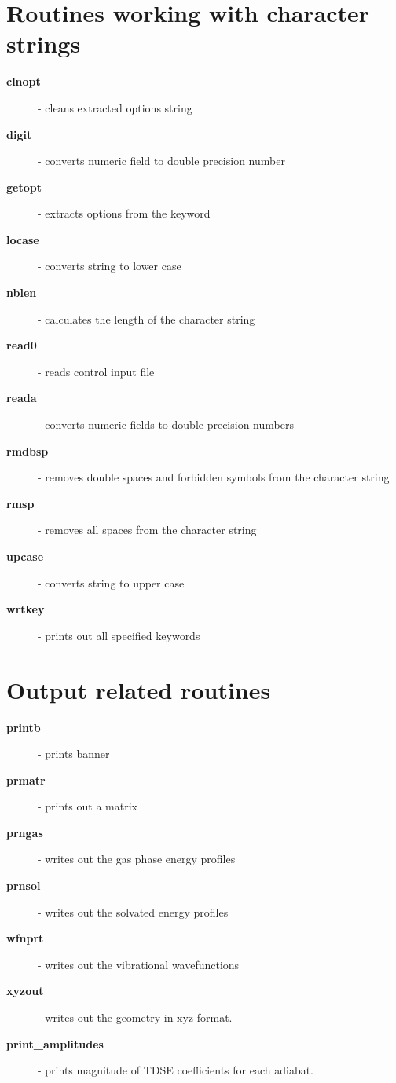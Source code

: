 \documentclass[oneside,11pt,openany]{book}
\newcommand{\tw}{\ttfamily}
\begin{document}
%
\section{Routines working with character strings}
\begin{description}
\item[{\tw\bf clnopt}] - cleans extracted options string
\item[{\tw\bf digit}] - converts numeric field to double precision number
\item[{\tw\bf getopt}] - extracts options from the keyword
\item[{\tw\bf locase}] - converts string to lower case
\item[{\tw\bf nblen}] - calculates the length of the character string
\item[{\tw\bf read0}] - reads control input file
\item[{\tw\bf reada}] - converts numeric fields to double precision numbers
\item[{\tw\bf rmdbsp}] - removes double spaces and forbidden symbols
                      from the character string
\item[{\tw\bf rmsp}] - removes all spaces from the character string
\item[{\tw\bf upcase}] - converts string to upper case
\item[{\tw\bf wrtkey}] - prints out all specified keywords
\end{description}

%
\section{Output related routines}
\begin{description}
\item[{\tw\bf printb}] - prints banner
\item[{\tw\bf prmatr}] - prints out a matrix
\item[{\tw\bf prngas}] - writes out the gas phase energy profiles
\item[{\tw\bf prnsol}] - writes out the solvated energy profiles
\item[{\tw\bf wfnprt}] - writes out the vibrational wavefunctions
\item[{\tw\bf xyzout}] - writes out the geometry in xyz format.
\item[{\tw\bf print\_amplitudes}] - prints magnitude of TDSE coefficients for each adiabat.
\end{description}
\end{document}
